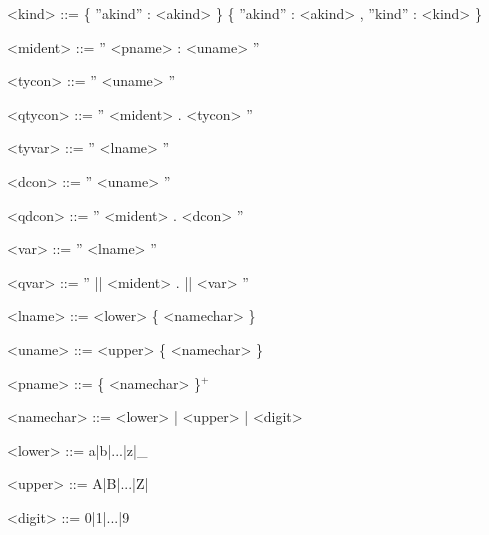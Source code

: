 \begin{grammar}

<kind>		  ::= 	\{ ''akind'' : <akind> \}					
		  \alt 	\{ ''akind'' : <akind> , ''kind'' : <kind> \}		

<mident>	  ::= 	 '' <pname> : <uname> ''
	
<tycon>		  ::= 	 '' <uname> ''
		
<qtycon>	  ::= 	 '' <mident> . <tycon> ''

<tyvar>		  ::= 	 '' <lname> ''
	
<dcon>		  ::= 	 '' <uname> ''
	
<qdcon>		  ::= 	 '' <mident> . <dcon> ''

<var>		  ::= 	 '' <lname> ''

<qvar>		  ::= 	 '' || <mident> . || <var> ''

<lname>		  ::= 	 <lower> \{ <namechar> \}
 
<uname>		  ::= 	 <upper> \{ <namechar> \}

<pname>		  ::= 	 \{ <namechar> \}$^+$

<namechar>	  ::= 	 <lower> | <upper> | <digit>

<lower>		  ::= 	 a|b|...|z|\_

<upper>		  ::= 	 A|B|...|Z|

<digit>		  ::= 	 0|1|...|9									 


\end{grammar}


